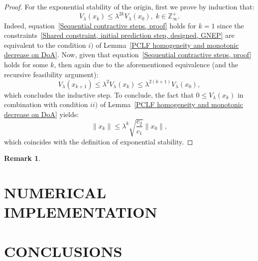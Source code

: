 \documentclass[letterpaper, 10 pt, conference]{ieeeconf}  %
\newtheorem{remark}{Remark}
\begin{document}
\begin{proof}
For the exponential stability of the origin, first we prove by induction that:
\begin{equation}\label{Sequential contractive steps, proof}
V_{\lambda}(x_{k}) \leq \lambda^{2k} V_{\lambda}(x_{0}),\; k \in \mathbb{Z}^{+}_{\infty}.
\end{equation}
Indeed, equation~\eqref{Sequential contractive steps, proof} holds for $k=1$ since the constraints~\eqref{Shared constraint, initial prediction step, designed, GNEP} are equivalent to the condition $i)$ of Lemma~\ref{PCLF homogeneity and monotonic decrease on DoA}. Now, given that equation~\eqref{Sequential contractive steps, proof} holds for some $k$, then again due to the aforementioned equivalence (and the recursive feasibility argument):
\begin{equation}
V_{\lambda}(x_{k+1}) \leq \lambda^{2}V_{\lambda}(x_{k}) \leq \lambda^{2(k+1)}V_{\lambda}(x_{0}),
\end{equation}
which concludes the inductive step. To conclude, the fact that $0 \leq V_{\lambda}(x_{k})$ in combination with condition $ii)$ of  Lemma~\ref{PCLF homogeneity and monotonic decrease on DoA} yields:
\begin{equation}\label{Exponential Stability}
\|x_{k}\| \leq \lambda^{k} \sqrt{\frac{c_{2}}{c_{1}}}\|x_{0}\|,
\end{equation}
which coincides with the definition of exponential stability.
\end{proof}
\begin{remark}

\end{remark}

\section{NUMERICAL IMPLEMENTATION}

\section{CONCLUSIONS}

\addtolength{\textheight}{-12cm}   %
\end{document}
